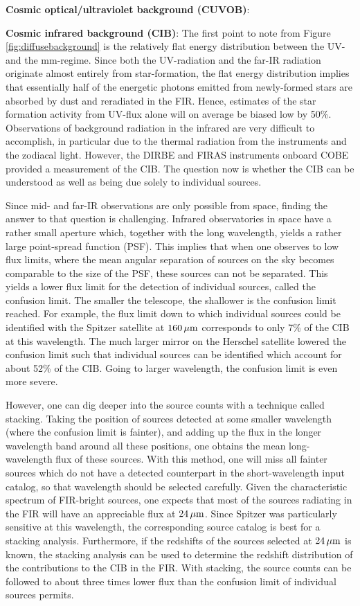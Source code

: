 \documentclass[a4paper,11pt]{article}
\begin{document}
{\noindent}\textbf{Cosmic optical/ultraviolet background (CUVOB)}: 

{\noindent}\textbf{Cosmic infrared background (CIB)}: The first point to note from Figure \ref{fig:diffusebackground} is the relatively flat energy distribution between the UV- and the mm-regime. Since both the UV-radiation and the far-IR radiation originate almost entirely from star-formation, the flat energy distribution implies that essentially half of the energetic photons emitted from newly-formed stars are absorbed by dust and reradiated in the FIR. Hence, estimates of the star formation activity from UV-flux alone will on average be biased low by 50\%. Observations of background radiation in the infrared are very difficult to accomplish, in particular due to the thermal radiation from the instruments and the zodiacal light. However, the DIRBE and FIRAS instruments onboard COBE provided a measurement of the CIB. The question now is whether the CIB can be understood as well as being due solely to individual sources.

{\noindent}Since mid- and far-IR observations are only possible from space, finding the answer to that question is challenging. Infrared observatories in space have a rather small aperture which, together with the long wavelength, yields a rather large point-spread function (PSF). This implies that when one observes to low flux limits, where the mean angular separation of sources on the sky becomes comparable to the size of the PSF, these sources can not be separated. This yields a lower flux limit for the detection of individual sources, called the confusion limit. The smaller the telescope, the shallower is the confusion limit reached. For example, the flux limit down to which individual sources could be identified with the Spitzer satellite at $160\,\mu{\rm m}$ corresponds to only 7\% of the CIB at this wavelength. The much larger mirror on the Herschel satellite lowered the confusion limit such that individual sources can be identified which account for about 52\% of the CIB. Going to larger wavelength, the confusion limit is even more severe.

{\noindent}However, one can dig deeper into the source counts with a technique called stacking. Taking the position of sources detected at some smaller wavelength (where the confusion limit is fainter), and adding up the flux in the longer wavelength band around all these positions, one obtains the mean long-wavelength flux of these sources. With this method, one will miss all fainter sources which do not have a detected counterpart in the short-wavelength input catalog, so that wavelength should be selected carefully. Given the characteristic spectrum of FIR-bright sources, one expects that most of the sources radiating in the FIR will have an appreciable flux at $24\,\mu{\rm m}$. Since Spitzer was particularly sensitive at this wavelength, the corresponding source catalog is best for a stacking analysis. Furthermore, if the redshifts of the sources selected at $24\,\mu{\rm m}$ is known, the stacking analysis can be used to determine the redshift distribution of the contributions to the CIB in the FIR. With stacking, the source counts can be followed to about three times lower flux than the confusion limit of individual sources permits.
\end{document}

